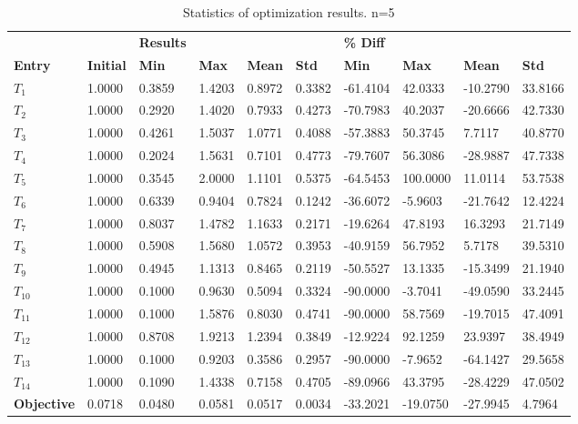 \begin{table}[H]
\centering
\begin{tabular}{llllllllll}
\textbf{} & \textbf{} & \cellcolor[HTML]{EFEFEF}\textbf{Results} & \cellcolor[HTML]{EFEFEF} & \cellcolor[HTML]{EFEFEF} & \cellcolor[HTML]{EFEFEF} & \cellcolor[HTML]{EFEFEF}\textbf{\% Diff} & \cellcolor[HTML]{EFEFEF} & \cellcolor[HTML]{EFEFEF} & \cellcolor[HTML]{EFEFEF} \\
\rowcolor[HTML]{EFEFEF} 
\textbf{Entry} & \textbf{Initial} & \textbf{Min} & \textbf{Max} & \textbf{Mean} & \textbf{Std} & \textbf{Min} & \textbf{Max} & \textbf{Mean} & \textbf{Std} \\
$T_1$ & 1.0000 & 0.3859 & 1.4203 & 0.8972 & 0.3382 & -61.4104 & 42.0333 & -10.2790 & 33.8166 \\ 
$T_2$ & 1.0000 & 0.2920 & 1.4020 & 0.7933 & 0.4273 & -70.7983 & 40.2037 & -20.6666 & 42.7330 \\ 
$T_3$ & 1.0000 & 0.4261 & 1.5037 & 1.0771 & 0.4088 & -57.3883 & 50.3745 & 7.7117 & 40.8770 \\ 
$T_4$ & 1.0000 & 0.2024 & 1.5631 & 0.7101 & 0.4773 & -79.7607 & 56.3086 & -28.9887 & 47.7338 \\ 
$T_5$ & 1.0000 & 0.3545 & 2.0000 & 1.1101 & 0.5375 & -64.5453 & 100.0000 & 11.0114 & 53.7538 \\ 
$T_6$ & 1.0000 & 0.6339 & 0.9404 & 0.7824 & 0.1242 & -36.6072 & -5.9603 & -21.7642 & 12.4224 \\ 
$T_7$ & 1.0000 & 0.8037 & 1.4782 & 1.1633 & 0.2171 & -19.6264 & 47.8193 & 16.3293 & 21.7149 \\ 
$T_8$ & 1.0000 & 0.5908 & 1.5680 & 1.0572 & 0.3953 & -40.9159 & 56.7952 & 5.7178 & 39.5310 \\ 
$T_9$ & 1.0000 & 0.4945 & 1.1313 & 0.8465 & 0.2119 & -50.5527 & 13.1335 & -15.3499 & 21.1940 \\ 
$T_10$ & 1.0000 & 0.1000 & 0.9630 & 0.5094 & 0.3324 & -90.0000 & -3.7041 & -49.0590 & 33.2445 \\ 
$T_11$ & 1.0000 & 0.1000 & 1.5876 & 0.8030 & 0.4741 & -90.0000 & 58.7569 & -19.7015 & 47.4091 \\ 
$T_12$ & 1.0000 & 0.8708 & 1.9213 & 1.2394 & 0.3849 & -12.9224 & 92.1259 & 23.9397 & 38.4949 \\ 
$T_13$ & 1.0000 & 0.1000 & 0.9203 & 0.3586 & 0.2957 & -90.0000 & -7.9652 & -64.1427 & 29.5658 \\ 
$T_14$ & 1.0000 & 0.1090 & 1.4338 & 0.7158 & 0.4705 & -89.0966 & 43.3795 & -28.4229 & 47.0502 \\ 
\rowcolor[HTML]{EFEFEF} 
\textbf{Objective} & 0.0718 & 0.0480 & 0.0581 & 0.0517 & 0.0034 & -33.2021 & -19.0750 & -27.9945 & 4.7964 \\ 
\end{tabular}
\caption{Statistics of optimization results. n=5}
\label{tab:StatisticsOptimizationAnalysis}
\end{table}